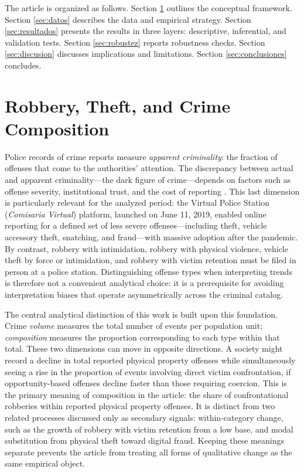 \documentclass[pdflatex,sn-basic]{sn-jnl}
\begin{document}
The article is organized as follows. Section \ref{sec:marco} outlines the conceptual framework. Section \ref{sec:datos} describes the data and empirical strategy. Section \ref{sec:resultados} presents the results in three layers: descriptive, inferential, and validation tests. Section \ref{sec:robustez} reports robustness checks. Section \ref{sec:discusion} discusses implications and limitations. Section \ref{sec:conclusiones} concludes.


\section{Robbery, Theft, and Crime Composition}
\label{sec:marco}

Police records of crime reports measure \emph{apparent criminality}: the fraction of offenses that come to the authorities' attention. The discrepancy between actual and apparent criminality---the dark figure of crime---depends on factors such as offense severity, institutional trust, and the cost of reporting \citep{gamarra2024a}. This last dimension is particularly relevant for the analyzed period: the Virtual Police Station (\textit{Comisaria Virtual}) platform, launched on June 11, 2019, enabled online reporting for a defined set of less severe offenses---including theft, vehicle accessory theft, snatching, and fraud---with massive adoption after the pandemic. By contrast, robbery with intimidation, robbery with physical violence, vehicle theft by force or intimidation, and robbery with victim retention must be filed in person at a police station. Distinguishing offense types when interpreting trends is therefore not a convenient analytical choice: it is a prerequisite for avoiding interpretation biases that operate asymmetrically across the criminal catalog.

The central analytical distinction of this work is built upon this foundation. Crime \emph{volume} measures the total number of events per population unit; \emph{composition} measures the proportion corresponding to each type within that total. These two dimensions can move in opposite directions. A society might record a decline in total reported physical property offenses while simultaneously seeing a rise in the proportion of events involving direct victim confrontation, if opportunity-based offenses decline faster than those requiring coercion. This is the primary meaning of composition in the article: the share of confrontational robberies within reported physical property offenses. It is distinct from two related processes discussed only as secondary signals: within-category change, such as the growth of robbery with victim retention from a low base, and modal substitution from physical theft toward digital fraud. Keeping these meanings separate prevents the article from treating all forms of qualitative change as the same empirical object.
\end{document}
